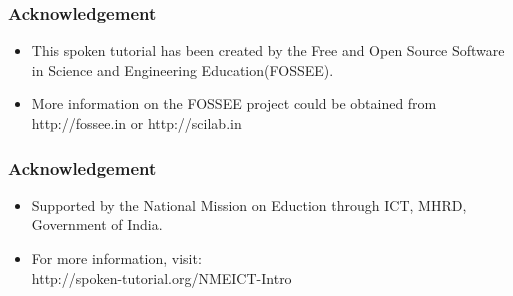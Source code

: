 \documentclass[17pt]{beamer}
\begin{document}

\begin{frame}[fragile]
\frametitle{Acknowledgement}
\begin{itemize}
\item This spoken tutorial has been created by the Free and Open Source Software in Science and Engineering Education(FOSSEE).\pause
\item More information on the FOSSEE project could be obtained from {\color{magenta}http://fossee.in} or {\color{magenta}http://scilab.in}\pause
\end{itemize}
\end{frame}

\begin{frame}[fragile]
\frametitle{Acknowledgement}
\begin{itemize}
\item Supported by the National Mission on Eduction through ICT, MHRD, Government of India.\pause
\item For more information, visit: \\
	{\color{magenta}http://spoken-tutorial.org/NMEICT-Intro}

\end{itemize}
\end{frame}
\end{document}

